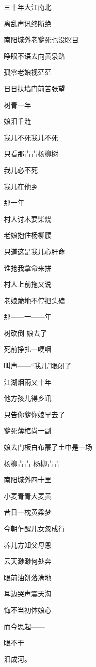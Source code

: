 \par 
\par 三十年大江南北
\par 离乱声讯终断绝
\par 南阳城外老爹死也没瞑目
\par 睁眼不语去向黄泉路
\par 孤零老娘视茫茫
\par 日日扶墙门前苦张望
\par 树青一年
\par 娘泪千涟
\par 我儿不死我儿不死
\par 只看那青青杨柳树
\par 我儿必不死
\par 我儿在他乡
\par 
\par 那一年
\par 村人讨木要柴烧
\par 老娘抱住杨柳腰
\par 只道这是我儿心肝命
\par 谁抢我拿命来拼
\par 村人上前拖又说
\par 老娘跪地不停把头磕
\par 那——一——年
\par 树砍倒 娘去了
\par 死前挣扎一哽咽
\par 叫声——“我儿”眼闭了
\par 
\par 江湖烟雨又十年
\par 他方孩儿得乡讯
\par 只告你爹你娘早去了
\par 爹死薄棺尚一副
\par 娘去门板白布蒙了土中是一场
\par 
\par 杨柳青青 杨柳青青
\par 南阳城外四十里
\par 小麦青青大麦黄
\par 昔日一枕黄粱梦
\par 今朝乍醒儿女忽成行
\par 养儿方知父母恩
\par 云天渺渺何处奔
\par 眼前油饼落满地
\par 耳边哭声震天淘
\par 悔不当初体娘心
\par 而今思起——
\par 眼不干
\par 泪成河。









